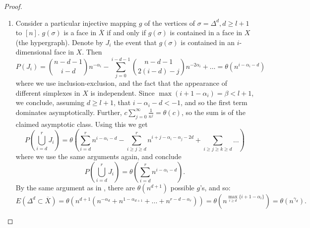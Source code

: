 \documentclass{article}
\newcommand{\prs}[1]{\left( #1 \right)}
\theoremstyle{plain}
\theoremstyle{definition}
\theoremstyle{remark}
\newcommand{\di}{dimension}
\begin{document}
\begin{proof} \begin{enumerate}
    \item Consider a particular injective mapping $g$ of the vertices of $\sigma=\Delta^d, d\ge l+1$ to $[n]$. $g(\sigma)$ is a face in $\overline{X}$ if and only if $g(\sigma)$ is contained in a face in $X$ (the hypergraph).
Denote by $J_i$ the event that $g(\sigma)$ is contained in an $i$-\di al face in $X$. Then 
$$P(J_i)=\binom{n-d-1}{i-d}n^{-\alpha_i}-\sum_{j=0}^{i-d-1}\binom{n-d-1}{2(i-d)-j}n^{-2\alpha_i}+\dots=\theta(n^{i-\alpha_i-d})$$
where we use inclusion-exclusion, and the fact that the appearance of different simplexes in $X$ is independent. Since $\max(i+1-\alpha_i)=\beta<l+1$, we conclude, assuming $d\ge l+1$, that $i-\alpha_i-d<-1$, and so the first term dominates asymptotically.
Further, $c\sum_{j=0} ^\infty\frac{1}{n^j}=\theta(c)$, so the sum is of the claimed asymptotic class.
Using this we get 
$$P\prs{\bigcup_{i=d} ^r J_i}=\theta\prs{\sum_{i=d} ^r n^{i-\alpha_i-d}-\sum_{i\ge j\ge d} ^r n^{i+j-\alpha_i-\alpha_j-2d}+ \sum_{i\ge j\ge k\ge d}\dots}$$
where we use the same arguments again, and conclude 
$$P\prs{\bigcup_{i=d} ^r J_i}=\theta\prs{\sum_{i=d} ^r n^{i-\alpha_i-d}}.$$
By the same argument as in , there are $\theta(n^{d+1})$ possible $g$'s, and so:
\begin{equation}\label{bugdetUpper}
    E(\Delta^{d}\subset \overline{X})=\theta(n^{d+1}(n^{-\alpha_d}+n^{1-\alpha_{d+1}}+...+n^{r-d-\alpha_r}))=\theta(n^{\max_{i\ge d}\{ i+1-\alpha_i\}})=\theta(n^{\gamma_d}).
\end{equation}


\end{enumerate}
\end{proof}
\end{document}
